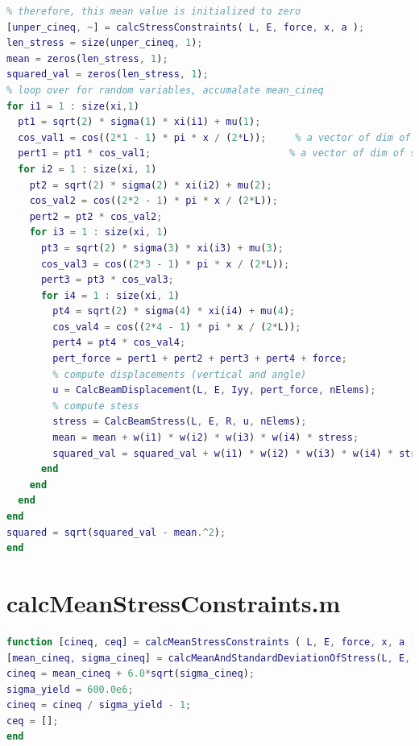 \documentclass[a4paper]{article}
\begin{document}
\begin{appendices}
\begin{lstlisting}[language=Matlab]
% later we accumulate the whole loading rather just the perturbed loading,
% therefore, this mean value is initialized to zero
[unper_cineq, ~] = calcStressConstraints( L, E, force, x, a );
len_stress = size(unper_cineq, 1);
mean = zeros(len_stress, 1);
squared_val = zeros(len_stress, 1);
% loop over for random variables, accumalate mean_cineq
for i1 = 1 : size(xi,1)
  pt1 = sqrt(2) * sigma(1) * xi(i1) + mu(1);
  cos_val1 = cos((2*1 - 1) * pi * x / (2*L));     % a vector of dim of size(x,1)
  pert1 = pt1 * cos_val1;                        % a vector of dim of size(x,1)
  for i2 = 1 : size(xi, 1)
    pt2 = sqrt(2) * sigma(2) * xi(i2) + mu(2);
    cos_val2 = cos((2*2 - 1) * pi * x / (2*L));
    pert2 = pt2 * cos_val2;
    for i3 = 1 : size(xi, 1)
      pt3 = sqrt(2) * sigma(3) * xi(i3) + mu(3);
      cos_val3 = cos((2*3 - 1) * pi * x / (2*L));
      pert3 = pt3 * cos_val3;     
      for i4 = 1 : size(xi, 1)
        pt4 = sqrt(2) * sigma(4) * xi(i4) + mu(4);
        cos_val4 = cos((2*4 - 1) * pi * x / (2*L));
        pert4 = pt4 * cos_val4;
        pert_force = pert1 + pert2 + pert3 + pert4 + force;
        % compute displacements (vertical and angle)
        u = CalcBeamDisplacement(L, E, Iyy, pert_force, nElems);
        % compute stess
        stress = CalcBeamStress(L, E, R, u, nElems);
        mean = mean + w(i1) * w(i2) * w(i3) * w(i4) * stress;
        squared_val = squared_val + w(i1) * w(i2) * w(i3) * w(i4) * stress.^2;
      end
    end
  end
end
squared = sqrt(squared_val - mean.^2);
end
\end{lstlisting} 

\section{calcMeanStressConstraints.m}\label{app:new_const2}
\begin{lstlisting}[language=Matlab]
function [cineq, ceq] = calcMeanStressConstraints ( L, E, force, x, a )
[mean_cineq, sigma_cineq] = calcMeanAndStandardDeviationOfStress(L, E, force, x, a);
cineq = mean_cineq + 6.0*sqrt(sigma_cineq);
sigma_yield = 600.0e6;
cineq = cineq / sigma_yield - 1;
ceq = [];
end
\end{lstlisting} 





\end{appendices}
\end{document}
